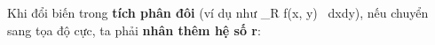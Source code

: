 \documentclass[preview]{standalone}
\begin{document}
\begin{center}
Khi đổi biến trong \textbf{tích phân đôi} (ví dụ như \iint_R f(x, y) \, dxdy), nếu chuyển sang tọa độ cực, ta phải \textbf{nhân thêm hệ số r}:
\end{center}
\end{document}
